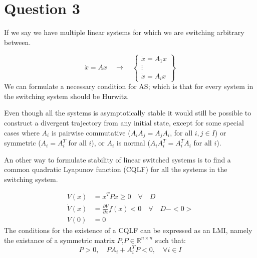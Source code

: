 \chapter{Question 3}
If we say we have multiple linear systems for which we are switching arbitrary between.

\begin{equation}
        \dot{x} = Ax \quad \rightarrow \quad
        \begin{Bmatrix}
                \dot{x} = A_1 x \\
                \vdots \\
                \dot{x} = A_i x
        \end{Bmatrix}
\end{equation}
We can formulate a necessary condition for AS; which is that for every system in the switching system should be Hurwitz.

Even though all the systems is asymptotically stable it would still be possible to construct a divergent trajectory from any initial state, except for some special cases where $A_i$ is pairwise commutative ($A_iA_j = A_j A_i$, for all $i,j \in I$) or symmetric ($A_i = A_i^T$ for all $i$), or $A_i$ is normal ($A_iA_i^T = A_i^T A_i$ for all $i$).

An other way to formulate stability of linear switched systems is to find a common quadratic Lyapunov function (CQLF) for all the systems in the switching system.

\begin{equation}
        \begin{split}
                V(x) &= x^T P x \geq 0 \quad \forall \quad D \\
                \dot{V}(x) &= \frac{\partial V}{\partial x} f(x) < 0 \quad \forall \quad D - <0> \\
                V(0) &= 0
        \end{split}
\end{equation}
The conditions for the existence of a CQLF can be expressed as an LMI, namely the existance of a symmetric matrix $P$,$P \in \mathbb{R}^{n\times n}$ such that:
\begin{equation}
        P > 0, \quad PA_i + A_i^TP < 0, \quad \forall i \in I
\end{equation}